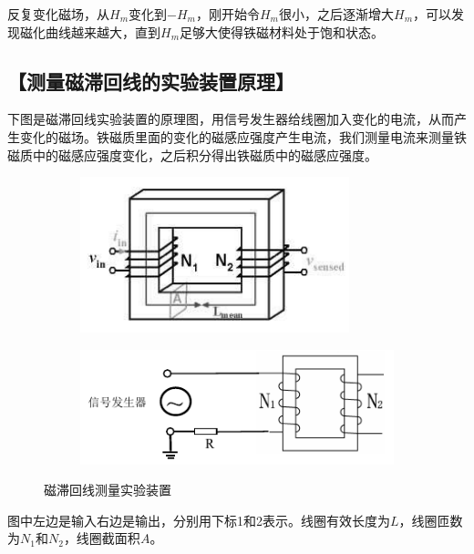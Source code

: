 \documentclass{ctexart}
\let\oldsubsection\subsection
\renewcommand{\subsection}[1]{\oldsubsection{\!\!\!\!\!\!【#1】}}
\begin{document}
反复变化磁场，从$H_m$变化到$-H_m$，刚开始令$H_m$很小，之后逐渐增大$H_m$，可以发现磁化曲线越来越大，直到$H_m$足够大使得铁磁材料处于饱和状态。

\subsection{测量磁滞回线的实验装置原理}

下图是磁滞回线实验装置的原理图，用信号发生器给线圈加入变化的电流，从而产生变化的磁场。铁磁质里面的变化的磁感应强度产生电流，我们测量电流来测量铁磁质中的磁感应强度变化，之后积分得出铁磁质中的磁感应强度。

\begin{figure}[H]
  \centering
  \begin{subfigure}{0.38\linewidth}
    \includegraphics[width=\linewidth]{figures/磁滞回线装置-线圈}
  \end{subfigure}
  \begin{subfigure}{0.58\linewidth}
    \includegraphics[width=\linewidth]{figures/磁滞回线装置-测量电路}
  \end{subfigure}
  \caption{磁滞回线测量实验装置}
\end{figure}

图中左边是输入右边是输出，分别用下标1和2表示。线圈有效长度为$L$，线圈匝数为$N_1$和$N_2$，线圈截面积$A$。
\end{document}

